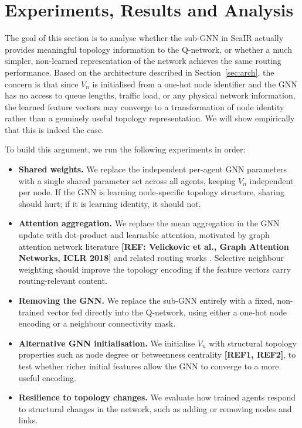 \documentclass[10pt,twocolumn,letterpaper]{article}
\begin{document}

\section{Experiments, Results and Analysis}
\label{sec:experiments}

The goal of this section is to analyse whether the sub-GNN in ScaIR actually provides meaningful topology information to the Q-network, or whether a much simpler, non-learned representation of the network achieves the same routing performance. Based on the architecture described in Section~\ref{sec:arch}, the concern is that since $V_n$ is initialised from a one-hot node identifier and the GNN has no access to queue lengths, traffic load, or any physical network information, the learned feature vectors may converge to a transformation of node identity rather than a genuinely useful topology representation. We will show empirically that this is indeed the case.

To build this argument, we run the following experiments in order:

\begin{itemize}
    \item \textbf{Shared weights.} We replace the independent per-agent GNN parameters with a single shared parameter set across all agents, keeping $V_n$ independent per node. If the GNN is learning node-specific topology structure, sharing should hurt; if it is learning identity, it should not.
    \item \textbf{Attention aggregation.} We replace the mean aggregation in the GNN update with dot-product and learnable attention, motivated by graph attention network literature \textbf{[REF: Velickovic et al., Graph Attention Networks, ICLR 2018]} and related routing works \cite{autognn}. Selective neighbour weighting should improve the topology encoding if the feature vectors carry routing-relevant content.
    \item \textbf{Removing the GNN.} We replace the sub-GNN entirely with a fixed, non-trained vector fed directly into the Q-network, using either a one-hot node encoding or a neighbour connectivity mask.
    \item \textbf{Alternative GNN initialisation.} We initialise $V_n$ with structural topology properties such as node degree or betweenness centrality \textbf{[REF1, REF2]}, to test whether richer initial features allow the GNN to converge to a more useful encoding.
    \item \textbf{Resilience to topology changes.} We evaluate how trained agents respond to structural changes in the network, such as adding or removing nodes and links.
\end{itemize}
\end{document}
